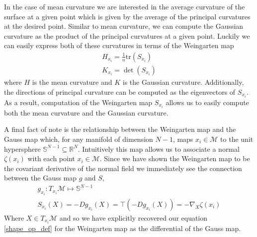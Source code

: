 \documentclass{article}
\begin{document}
In the case of mean curvature we are interested in the average curvature of the surface at a given point which is given by the average of the principal curvatures at the desired point. Similar to mean curvature, we can compute the Gaussian curvature as the product of the principal curvatures at a given point. Luckily we can easily express both of these curvatures in terms of the Weingarten map  
\begin{equation} \label{curvature_comp}
    \begin{gathered}
        H_{x_i} = \frac{1}{n} \text{tr} (S_{x_i}) \\
        K_{x_i} = \det(S_{x_i})
    \end{gathered}
\end{equation}
where $H$ is the mean curvature and $K$ is the Gaussian curvature. Additionally, the directions of principal curvature can be computed as the eigenvectors of $S_{x_i}$. As a result, computation of the Weingarten map $S_{x_i}$ allows us to easily compute both the mean curvature and the Gaussian curvature. 

A final fact of note is the relationship between the Weingarten map and the Gauss map which, for any manifold of dimension $N-1$, maps $x_i \in \mathcal{M}$ to the unit hypersphere $\mathbb{S}^{N-1} \subseteq \mathbb{R}^N$. Intuitively this map allows us to associate a normal $\zeta(x_i)$ with each point $x_i \in \mathcal{M}$. Since we have shown the Weingarten map to be the covariant derivative of the normal field we immediately see the connection between the Gauss map $g$ and $S$,
\begin{equation}
    \begin{gathered}
            g_{x_i} :  T_{x_i} \mathcal{M} \mapsto \mathbb{S}^{N-1} \\
            S_{x_i}(X) = -Dg_{x_i}(X) = \top(-D g_{x_i}(X)) = -\nabla_{X} \zeta (x_i)
    \end{gathered}
\end{equation}
Where $X \in T_{x_i} \mathcal{M}$ and so we have explicitly recovered our equation \eqref{shape_op_def} for the Weingarten map as the differential of the Gauss map. 
\end{document}
